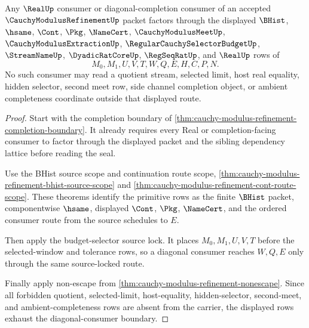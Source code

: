 \begin{theorem}
\label{thm:cauchy-modulus-refinement-diagonal-consumer-boundary}
Any $\RealUp$ consumer or diagonal-completion consumer of an accepted $\CauchyModulusRefinementUp$ packet factors through the displayed $\BHist$, $\hsame$, $\Cont$, $\Pkg$, $\NameCert$, $\CauchyModulusMeetUp$, $\CauchyModulusExtractionUp$, $\RegularCauchySelectorBudgetUp$, $\StreamNameUp$, $\DyadicRatCoreUp$, $\RegSeqRatUp$, and $\RealUp$ rows of
$$
M_0,M_1,U,V,T,W,Q,E,H,C,P,N.
$$
No such consumer may read a quotient stream, selected limit, host real equality, hidden selector, second meet row, side channel completion object, or ambient completeness coordinate outside that displayed route.
\end{theorem}
\begin{proof}
Start with the completion boundary of \autoref{thm:cauchy-modulus-refinement-completion-boundary}. It already requires every Real or completion-facing consumer to factor through the displayed packet and the sibling dependency lattice before reading the seal.

Use the BHist source scope and continuation route scope, \autoref{thm:cauchy-modulus-refinement-bhist-source-scope} and \autoref{thm:cauchy-modulus-refinement-cont-route-scope}. These theorems identify the primitive rows as the finite $\BHist$ packet, componentwise $\hsame$, displayed $\Cont$, $\Pkg$, $\NameCert$, and the ordered consumer route from the source schedules to $E$.

Then apply the budget-selector source lock. It places $M_0,M_1,U,V,T$ before the selected-window and tolerance rows, so a diagonal consumer reaches $W,Q,E$ only through the same source-locked route.

Finally apply non-escape from \autoref{thm:cauchy-modulus-refinement-nonescape}. Since all forbidden quotient, selected-limit, host-equality, hidden-selector, second-meet, and ambient-completeness rows are absent from the carrier, the displayed rows exhaust the diagonal-consumer boundary.
\end{proof}

